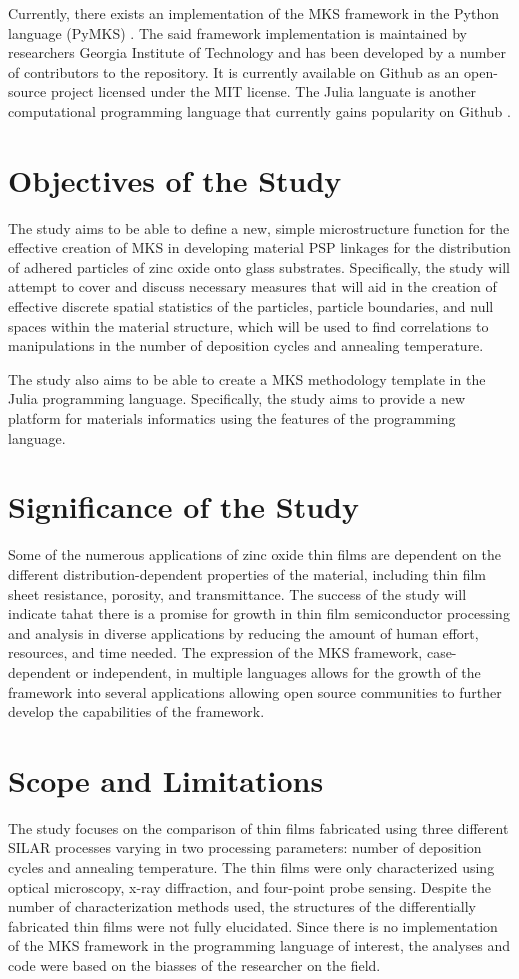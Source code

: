 Currently, there exists an implementation of the MKS framework in the Python language (PyMKS) \cite{pymks}.
The said framework implementation is maintained by researchers Georgia Institute of Technology and has been developed by a number of contributors to the repository.
It is currently available on Github as an open-source project licensed under the MIT license.
The Julia languate is another computational programming language that currently gains popularity on Github \cite{julia15}.

\section{Objectives of the Study}
The study aims to be able to define a new, simple microstructure function for the effective creation of MKS in developing material PSP linkages for the distribution of adhered particles of zinc oxide onto glass substrates.
Specifically, the study will attempt to cover and discuss necessary measures that will aid in the creation of effective discrete spatial statistics of the particles, particle boundaries, and null spaces within the material structure, which will be used to find correlations to manipulations in the number of deposition cycles and annealing temperature.

The study also aims to be able to create a MKS methodology template in the Julia programming language.
Specifically, the study aims to provide a new platform for materials informatics using the features of the programming language.


\section{Significance of the Study}
Some of the numerous applications of zinc oxide thin films are dependent on the different distribution-dependent properties of the material, including thin film sheet resistance, porosity, and transmittance.
The success of the study will indicate tahat there is a promise for growth in thin film semiconductor processing and analysis in diverse applications by reducing the amount of human effort, resources, and time needed.
The expression of the MKS framework, case-dependent or independent, in multiple languages allows for the growth of the framework into several applications allowing open source communities to further develop the capabilities of the framework.

\section{Scope and Limitations}
The study focuses on the comparison of thin films fabricated using three different SILAR processes varying in two processing parameters: number of deposition cycles and annealing temperature.
The thin films were only characterized using optical microscopy, x-ray diffraction, and four-point probe sensing.
Despite the number of characterization methods used, the structures of the differentially fabricated thin films were not fully elucidated.
Since there is no implementation of the MKS framework in the programming language of interest, the analyses and code were based on the biasses of the researcher on the field.
